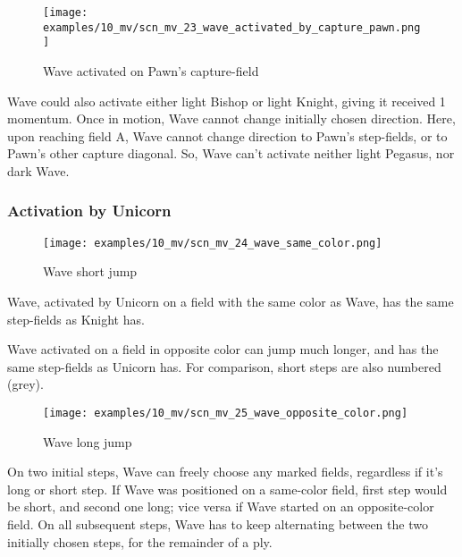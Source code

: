\clearpage %

\vspace*{-2.1\baselineskip}
\noindent
\begin{figure}[!h]
\texttt{[image: examples/10\_mv/scn\_mv\_23\_wave\_activated\_by\_capture\_pawn.png]}
\caption{Wave activated on Pawn's capture-field}
\label{fig:scn_mv_23_wave_activated_by_capture_pawn}
\end{figure}

Wave could also activate either light Bishop or light Knight, giving it received 1 momentum.
Once in motion, Wave cannot change initially chosen direction. Here, upon reaching field A,
Wave cannot change direction to Pawn's step-fields, or to Pawn's other capture diagonal. So,
Wave can't activate neither light Pegasus, nor dark Wave.

\clearpage %

\subsubsection*{Activation by Unicorn}

\vspace*{-0.7\baselineskip}
\noindent
\begin{wrapfigure}[10]{l}{0.45\textwidth}
\centering
\texttt{[image: examples/10\_mv/scn\_mv\_24\_wave\_same\_color.png]}
\vspace*{-0.3\baselineskip}
\caption{Wave short jump}
\label{fig:scn_mv_24_wave_same_color}
\end{wrapfigure}
Wave, activated by Unicorn on a field with the same color as Wave, has the same step-fields
as Knight has.

Wave activated on a field in opposite color can jump much longer, and has the same step-fields
as Unicorn has. For comparison, short steps are also numbered (grey).

\vspace*{0.7\baselineskip}
\noindent
\begin{wrapfigure}[18]{l}{0.7\textwidth}
\centering
\texttt{[image: examples/10\_mv/scn\_mv\_25\_wave\_opposite\_color.png]}
\vspace*{-0.3\baselineskip}
\caption{Wave long jump}
\label{fig:scn_mv_25_wave_opposite_color}
\end{wrapfigure}
On two initial steps, Wave can freely choose any marked fields, regardless if it's long or short step.
If Wave was positioned on a same-color field, first step would be short, and second one long; vice versa
if Wave started on an opposite-color field. On all subsequent steps, Wave has to keep alternating between
the two initially chosen steps, for the remainder of a ply.


